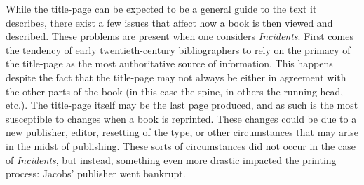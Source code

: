 While the title-page can be expected to be a general guide to the text it describes, there exist a few issues that affect how a book is then viewed and described. These problems are present when one considers \textit{Incidents}. First comes the tendency of early twentieth-century bibliographers to rely on the primacy of the title-page as the most authoritative source of information. This happens despite the fact that the title-page may not always be either in agreement with the other parts of the book (in this case the spine, in others the running head, etc.). The title-page itself may be the last page produced, and as such is the most susceptible to changes when a book is reprinted. These changes could be due to a new publisher, editor, resetting of the type, or other circumstances that may arise in the midst of publishing. These sorts of circumstances did not occur in the case of \textit{Incidents}, but instead, something even more drastic impacted the printing process: Jacobs' publisher went bankrupt. 

